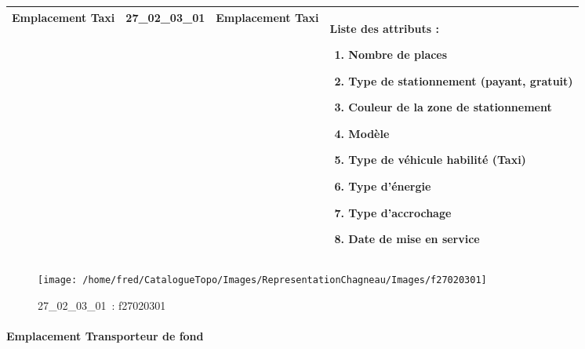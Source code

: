 \documentclass[12pt,titlepage]{book}
\begin{document}
\renewcommand{\arraystretch}{1.2}
\begin{supertabular}{|p{10cm}|c|p{13cm}|p{12cm}|}
 Emplacement Taxi & 27\_02\_03\_01 & Emplacement Taxi & Liste des attributs :
\begin{enumerate}
  \item Nombre de places  \item Type de stationnement (payant, gratuit)  \item Couleur de la zone de stationnement  \item Modèle  \item Type de véhicule habilité (Taxi)  \item Type d'énergie  \item Type d'accrochage  \item Date de mise en service\end{enumerate}
\\
\hline
\end{supertabular}
\begin{figure}[h!]
  \hfill         %
  \begin{minipage}[t]{3cm}
    \begin{center}
      \texttt{[image: /home/fred/CatalogueTopo/Images/RepresentationChagneau/Images/f27020301]}
      \caption[~27\_02\_03\_01]{\small{27\_02\_03\_01~:} \tiny{f27020301}}\label{f27020301}
    \end{center}
  \end{minipage}
\end{figure}


\paragraph{Emplacement Transporteur de fond}
\noindent
\vspace{\baselineskip}
\end{document}
